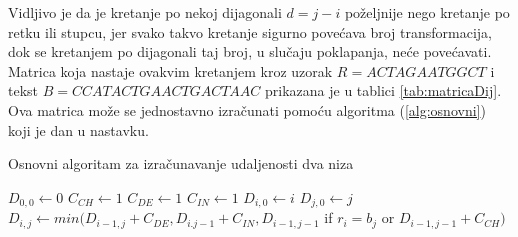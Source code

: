 \documentclass[times, utf8, zavrsni]{fer}
\begin{document}
Vidljivo je da je kretanje po nekoj dijagonali $d = j-i$ poželjnije nego kretanje po retku ili stupcu, jer svako takvo kretanje sigurno povećava broj transformacija, dok se kretanjem po dijagonali taj broj, u slučaju poklapanja, neće povećavati. Matrica koja nastaje ovakvim kretanjem kroz uzorak $R = ACTAGAATGGCT$ i tekst $B = CCATACTGAACTGACTAAC$ prikazana je u tablici \ref{tab:matricaDij}. Ova matrica može se jednostavno izračunati pomoću algoritma (\ref{alg:osnovni}) koji je dan u nastavku.

\begin{algorithm}
\caption{Osnovni algoritam za izračunavanje udaljenosti dva niza}\label{alg:osnovni}
\begin{algorithmic}
\State $D_{0,0} \gets 0$
\State $C_{CH}\gets 1$ 
\State $C_{DE} \gets 1$
\State $C_{IN} \gets 1$
 \State $D_{i,0} \gets i$ \EndFor
{} \State $D_{j,0} \gets j$ \EndFor
\linebreak
{}
        \State $D_{i,j} \gets min(D_{i-1,j}+C_{DE}, D_{i.j-1}+C_{IN}, D_{i-1,j-1} $ if $r_{i}=b_{j} $ or $ D_{i-1,j-1}+C_{CH})$
    \EndFor
\EndFor
\end{algorithmic}
\end{algorithm}
\end{document}
